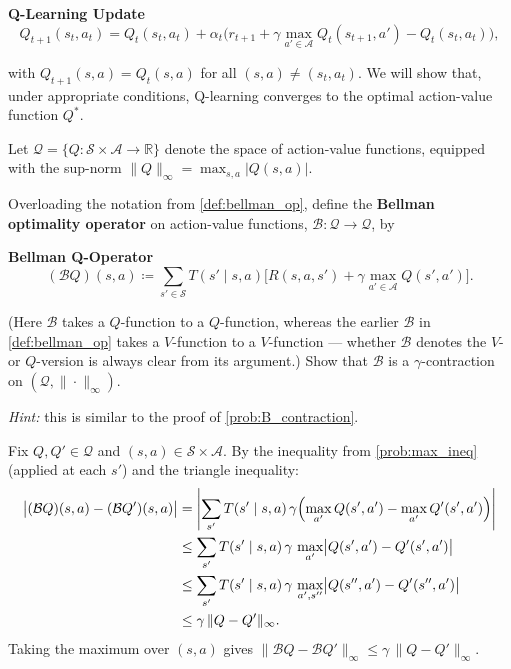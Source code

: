 \documentclass[11pt]{article}
\newcommand{\cS}{\mathcal{S}}
\newcommand{\cA}{\mathcal{A}}
\begin{document}
\begin{callout}[note]
\textbf{Q-Learning Update}
$$
Q_{t+1}(s_t, a_t) = Q_t(s_t, a_t) + \alpha_t\bigl(r_{t+1} + \gamma \max_{a' \in \cA} Q_t(s_{t+1}, a') - Q_t(s_t, a_t)\bigr),
$$
\end{callout}
with $Q_{t+1}(s,a) = Q_t(s,a)$ for all $(s,a) \neq (s_t, a_t)$.
We will show that, under appropriate conditions, Q-learning converges to the optimal action-value function $Q^*$.

Let $\mathcal{Q} = \{Q : \cS \times \cA \to \mathbb{R}\}$ denote the space of action-value functions, equipped with the sup-norm $\|Q\|_\infty = \max_{s,a} |Q(s,a)|$.

\begin{exercise}
\label{prob:BQ_contraction} Overloading the notation from \cref{def:bellman_op}, define the \textbf{Bellman optimality operator} on action-value functions, $\mathcal{B} : \mathcal{Q} \to \mathcal{Q}$, by
\begin{callout}[note]
\textbf{Bellman Q-Operator}
$$
(\mathcal{B}Q)(s,a) \coloneqq \sum_{s' \in \cS} T(s' \mid s, a)\bigl[R(s,a,s') + \gamma \max_{a' \in \cA} Q(s', a')\bigr].
$$
\end{callout}
(Here $\mathcal{B}$ takes a $Q$-function to a $Q$-function, whereas the earlier $\mathcal{B}$ in \cref{def:bellman_op} takes a $V$-function to a $V$-function --- whether $\mathcal{B}$ denotes the $V$- or $Q$-version is always clear from its argument.) Show that $\mathcal{B}$ is a $\gamma$-contraction on $(\mathcal{Q}, \|\cdot\|_\infty)$.

\textit{Hint:} this is similar to the proof of \cref{prob:B_contraction}.
\end{exercise}

\begin{solution}
Fix $Q, Q' \in \mathcal{Q}$ and $(s,a) \in \cS \times \cA$. By the inequality from \cref{prob:max_ineq} (applied at each $s'$) and the triangle inequality:
\begin{align*}
\bigl|(\mathcal{B}Q)(s,a) - (\mathcal{B}Q')(s,a)\bigr|
&= \left|\sum_{s'} T(s' \mid s,a)\,\gamma\Bigl(\max_{a'} Q(s',a') - \max_{a'} Q'(s',a')\Bigr)\right| \\
&\le \sum_{s'} T(s' \mid s,a)\,\gamma\,\max_{a'}\bigl|Q(s',a') - Q'(s',a')\bigr| \\
&\le \sum_{s'} T(s' \mid s,a)\,\gamma\,\max_{a', s''}\bigl|Q(s'',a') - Q'(s'',a')\bigr| \\
&\le \gamma\,\|Q - Q'\|_\infty.
\end{align*}
Taking the maximum over $(s,a)$ gives $\|\mathcal{B}Q - \mathcal{B}Q'\|_\infty \le \gamma\,\|Q - Q'\|_\infty$.
\end{solution}
\end{document}
